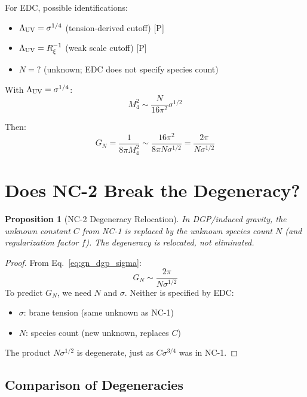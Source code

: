 \documentclass[11pt,a4paper]{article}
\newtheorem{proposition}{Proposition}
\theoremstyle{definition}
\newcommand{\Post}{\textsc{[P]}}
\begin{document}
For EDC, possible identifications:
\begin{itemize}
\item $\Lambda_{\rm UV} = \sigma^{1/4}$ (tension-derived cutoff) \Post
\item $\Lambda_{\rm UV} = R_\xi^{-1}$ (weak scale cutoff) \Post
\item $N = ?$ (unknown; EDC does not specify species count)
\end{itemize}

With $\Lambda_{\rm UV} = \sigma^{1/4}$:
\begin{equation}
M_4^2 \sim \frac{N}{16\pi^2} \sigma^{1/2}
\end{equation}

Then:
\begin{equation}
G_N = \frac{1}{8\pi M_4^2} \sim \frac{16\pi^2}{8\pi N \sigma^{1/2}}
= \frac{2\pi}{N \sigma^{1/2}}
\label{eq:gn_dgp_sigma}
\end{equation}

\section{Does NC-2 Break the Degeneracy?}

\begin{proposition}[NC-2 Degeneracy Relocation]
In DGP/induced gravity, the unknown constant $C$ from NC-1 is replaced by
the unknown species count $N$ (and regularization factor $f$). The degeneracy
is relocated, not eliminated.
\end{proposition}

\begin{proof}
From Eq.~\eqref{eq:gn_dgp_sigma}:
\[
G_N \sim \frac{2\pi}{N \sigma^{1/2}}
\]
To predict $G_N$, we need $N$ and $\sigma$. Neither is specified by EDC:
\begin{itemize}
\item $\sigma$: brane tension (same unknown as NC-1)
\item $N$: species count (new unknown, replaces $C$)
\end{itemize}
The product $N \sigma^{1/2}$ is degenerate, just as $C \sigma^{3/4}$ was
in NC-1.
\end{proof}

\subsection{Comparison of Degeneracies}
\end{document}
